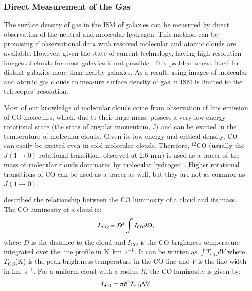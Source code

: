 \subsubsection{Direct Measurement of the Gas}

The surface density of gas in the ISM of galaxies can be measured by direct observation of the neutral and molecular hydrogen.
This method can be promising if observational data with resolved molecular and atomic clouds are available.
However, given the state of current technology, having high resolution images of clouds for most galaxies is not possible. 
This problem shows itself for distant galaxies more than nearby galaxies. 
As a result, using images of molecular and atomic gas clouds to measure surface density of gas in ISM is limited to the telescopes' resolution. 
 
Most of our knowledge of molecular clouds come from observation of line emission of CO molecules, which, due to their large mass, possess a very low energy rotational state (the state of angular momentum, J) and can be excited in the temperature of molecular clouds. %
Given its low energy and critical density, CO can easily be excited even in cold molecular clouds.
Therefore, $^{12}$CO (usually the $J(1\rightarrow 0)$ rotational transition, observed at 2.6 mm) is used as a tracer of the mass of molecular clouds dominated by molecular hydrogen~\citep[e.g.][]{Sanders84}.
Higher rotational transitions of CO can be used as a tracer as well, but they are not as common as $J(1\rightarrow 0)$.

\cite{Young91} described the relationship between the CO luminosity of a cloud and its mass. The CO luminosity of a cloud is:
\begin{equation}
L_{CO} = D^2 \int I_{\rm CO} d\Omega, 
\end{equation}
where $D$ is the distance to the cloud and $I_{\mathrm CO}$ is the CO brightness temperature integrated over the line profile in K~km~s$^{-1}$.
It can be written as ${\int T_{\mathrm CO} dV}$ where $T_{\mathrm CO}$(K) is the peak brightness temperature in the CO line and $V$ is the line-width in km~s$^{-1}$.
For a uniform cloud with a radius $R$, the CO luminosity is given by:
 \begin{equation}
L_{\rm CO} = \pi R^2 T_{\rm CO} \Delta V.
\end{equation}

